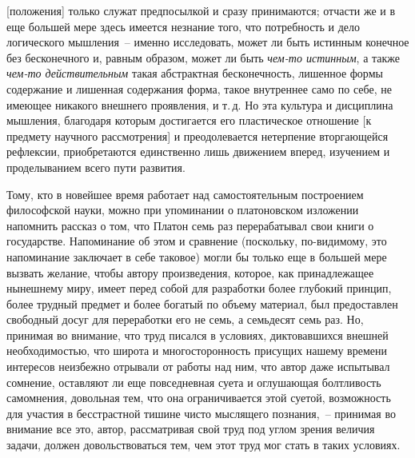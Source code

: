 [положения] только служат предпосылкой и сразу принимаются;
отчасти же и в еще большей мере здесь имеется
незнание того, что потребность и дело логического мышления~--
именно исследовать, может ли быть истинным
конечное без бесконечного и, равным образом, может ли
быть \emph{чем-то истинным}, а также \emph{чем-то действительным}
такая абстрактная бесконечность, лишенное формы содержание
и лишенная содержания форма, такое внутреннее
само по себе, не имеющее никакого внешнего проявления,
и т.\,д. Но эта культура и дисциплина мышления, благодаря
которым достигается его пластическое отношение
[к предмету научного рассмотрения] и преодолевается
нетерпение вторгающейся рефлексии, приобретаются
единственно лишь движением вперед, изучением и проделыванием
всего пути развития.


Тому, кто в новейшее время работает над самостоятельным
построением философской науки, можно при
упоминании о платоновском изложении напомнить рассказ
о том, что Платон семь раз перерабатывал свои книги
о государстве. Напоминание об этом и сравнение (поскольку,
по-видимому, это напоминание заключает в себе
таковое) могли бы только еще в большей мере вызвать
желание, чтобы автору произведения, которое, как принадлежащее
нынешнему миру, имеет перед собой для
разработки более глубокий принцип, более трудный предмет
и более богатый по объему материал, был предоставлен
свободный досуг для переработки его не семь, а семьдесят
семь раз. Но, принимая во внимание, что труд
писался в условиях, диктовавшихся внешней необходимостью,
что широта и многосторонность присущих нашему
времени интересов неизбежно отрывали от работы
над ним, что автор даже испытывал сомнение, оставляют
ли еще повседневная суета и оглушающая болтливость
самомнения, довольная тем, что она ограничивается этой
суетой, возможность для участия в бесстрастной тишине
чисто мыслящего познания,~-- принимая во внимание все
это, автор, рассматривая свой труд под углом зрения
величия задачи, должен довольствоваться тем, чем этот
труд мог стать в таких условиях.

\signature{Берлин, 7 ноября 1831\,г.}


